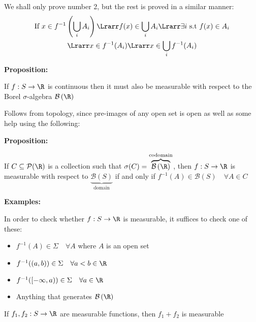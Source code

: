 \par\bigskip
\begin{prf}[]{}
  We shall only prove number 2, but the rest is proved in a similar manner:
  \begin{equation*}
    \begin{gathered}
      \text{If } x\in f^{-1}\left(\bigcup_i A_i\right)\Lrarr f(x)\in\bigcup_i A_i\Lrarr \exists i\text{ s.t } f(x)\in A_i\\
      \Lrarr x\in f^{-1}(A_i)\Lrarr x\in \bigcup_i f^{-1}(A_i)
    \end{gathered}
  \end{equation*}
\end{prf}
\par\bigskip
\noindent\textbf{Proposition:}\par
\noindent If $f:S\to\R$ is continuous then it must also be measurable with respect to the Borel $\sigma$-algebra $\mathcal{B}\left(\R\right)$
\par\bigskip
\begin{prf}[]{}
  Follows from topology, since pre-images of any open set is open as well as some help using the following:
\end{prf}\par
\noindent\textbf{Proposition:}\par
\noindent If $C\subseteq\mathcal{P}(\R)$ is a collection such that $\sigma(C) = \overbrace{\mathcal{B}\left(\R\right)}^{\text{codomain}}$, then $f:S\to\R$ is measurable with respect to $\underbrace{\mathcal{B}\left(S\right)}_{\text{domain}}$ if and only if $f^{-1}(A)\in\mathcal{B}\left(S\right)\quad\forall A\in C$
\par\bigskip
\noindent\textbf{Examples:}\par
\noindent In order to check whether $f:S\to\R$ is measurable, it suffices to check one of these:\par
\begin{itemize}
  \item $f^{-1}(A)\in\Sigma\quad\forall A$ where $A$ is an open set
  \item $f^{-1}((a,b))\in\Sigma\quad\forall a<b\in\R$
  \item $f^{-1}([-\infty,a))\in\Sigma\quad\forall a\in\R$
  \item Anything that generates $\mathcal{B}\left(\R\right)$
\end{itemize}
\par\bigskip
\begin{lem}[]{}
  If $f_1,f_2:S\to\R$ are measurable functions, then $f_1+f_2$ is measurable
\end{lem}
